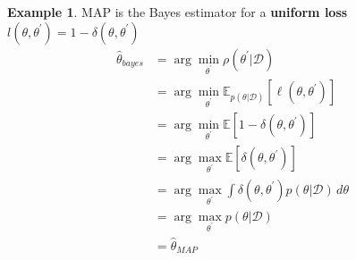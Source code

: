 \documentclass[12pt, a4paper]{article}
\theoremstyle{definition}
\newtheorem{example}{Example}[section]
\numberwithin{figure}{section}
\numberwithin{equation}{section}
\numberwithin{table}{section}
\begin{document}
\begin{example}{MAP is the Bayes estimator for a \textbf{uniform loss} $l(\theta,\theta^{'})=1-\delta(\theta,\theta^{'})$}
\begin{align}
\hat{\theta}_{bayes}
&=\arg\min\limits_{\theta^{'}}\rho(\theta^{'}|\mathcal{D})\\
&=\arg\min\limits_{\theta^{'}}\mathbb{E}_{p(\theta | \mathcal{D})} \left[ \ell(\theta, \theta^{'}) \right]\\
&=\arg\min\limits_{\theta^{'}}\mathbb{E} \left[1-\delta(\theta, \theta^{'}) \right]\\
&=\arg\max\limits_{\theta^{'}}\mathbb{E} \left[\delta(\theta, \theta^{'}) \right]\\
&=\arg\max\limits_{\theta^{'}}\int \delta(\theta, \theta^{'}) p(\theta | \mathcal{D}) \, d \theta\\
&=\arg\max\limits_{\theta^{'}}p(\theta | \mathcal{D})\\
&=\hat{\theta}_{MAP}
\end{align}
\end{example}
\end{document}
